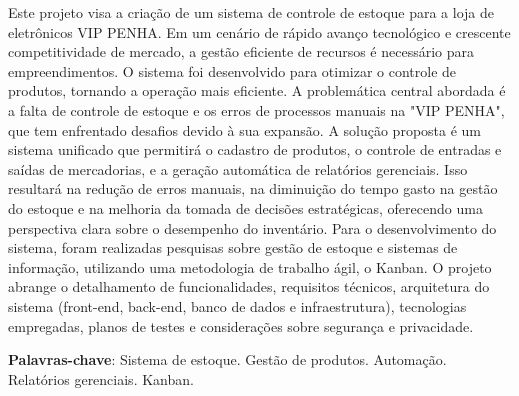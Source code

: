 \documentclass[
	12pt,				%
	openany,			%
	twoside,			%
	a4paper,			%
	english,			%
	brazil				%
	]{abntex2}
\begin{document}
\setlength{\absparsep}{18pt} %
\begin{resumo}
Este projeto visa a criação de um sistema de controle de estoque para a loja de eletrônicos VIP PENHA. Em um cenário de rápido avanço tecnológico e crescente competitividade de mercado, a gestão eficiente de recursos é necessário para empreendimentos. O sistema foi desenvolvido para otimizar o controle de produtos, tornando a operação mais eficiente.
A problemática central abordada é a falta de controle de estoque e os erros de processos manuais na "VIP PENHA", que tem enfrentado desafios devido à sua expansão. A solução proposta é um sistema unificado que permitirá o cadastro de produtos, o controle de entradas e saídas de mercadorias, e a geração automática de relatórios gerenciais. Isso resultará na redução de erros manuais, na diminuição do tempo gasto na gestão do estoque e na melhoria da tomada de decisões estratégicas, oferecendo uma perspectiva clara sobre o desempenho do inventário.
Para o desenvolvimento do sistema, foram realizadas pesquisas sobre gestão de estoque e sistemas de informação, utilizando uma metodologia de trabalho ágil, o Kanban. O projeto abrange o detalhamento de funcionalidades, requisitos técnicos, arquitetura do sistema (front-end, back-end, banco de dados e infraestrutura), tecnologias empregadas, planos de testes e considerações sobre segurança e privacidade. 

 \textbf{Palavras-chave}: Sistema de estoque. Gestão de produtos. Automação. Relatórios gerenciais. Kanban. 
\end{resumo}
\end{document}
